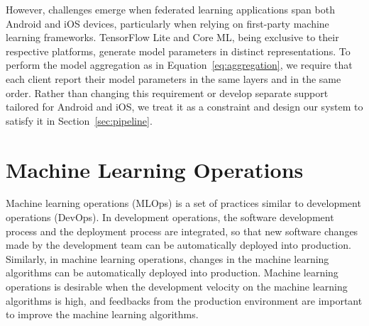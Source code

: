 However,
challenges emerge when federated learning applications span both Android and iOS
devices, particularly when relying on first-party machine learning frameworks.
TensorFlow Lite and Core ML, being exclusive to their respective platforms,
generate model parameters in distinct representations.
To perform the model aggregation as in Equation~\ref{eq:aggregation},
we require that each client report their model parameters in the same layers and
in the same order.
Rather than changing this requirement or develop separate support tailored for
Android and iOS,
we treat it as a constraint and design our system to satisfy it in
Section~\ref{sec:pipeline}.

\section{Machine Learning Operations}

Machine learning operations (MLOps) is a set of practices similar to
development operations (DevOps).
In development operations,
the software development process and the deployment process are integrated,
so that new software changes made by the development team can be
automatically deployed into production.
Similarly, in machine learning operations,
changes in the machine learning algorithms can be automatically deployed into
production.
Machine learning operations is desirable when the development velocity on
the machine learning algorithms is high,
and feedbacks from the production environment are important to improve
the machine learning algorithms.
